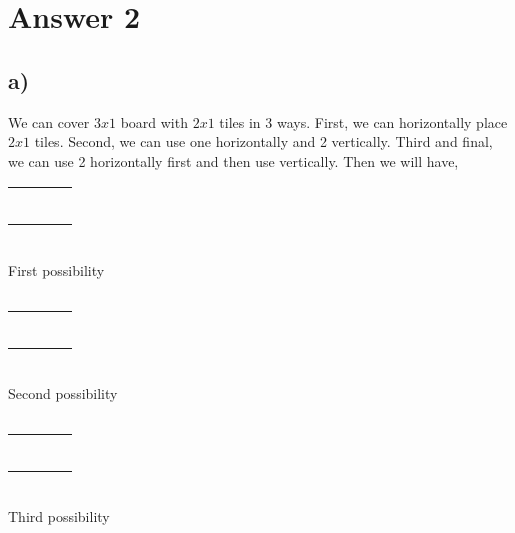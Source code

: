 \documentclass[12pt]{article}
\begin{document}
\section*{Answer 2}
\subsection*{a)}
We can cover $3x1$ board with $2x1$ tiles in 3 ways. First, we can horizontally place $2x1$ tiles. Second, we can use one horizontally and 2 vertically. Third and final, we can use 2 horizontally first and then use vertically. Then we will have, \\

\begin{tabular}{|cccc|}
\hline 
 &  &  & \tabularnewline
 &  &  & \tabularnewline
\hline 
\hline 
 &  &  & \tabularnewline
 &  &  & \tabularnewline
\hline 
\hline 
 &  &  & \tabularnewline
 &  &  & \tabularnewline
\hline 
\end{tabular} \\
First possibility

$ $ \\
$ $ \\

\begin{tabular}{|cc||cc|}
\hline 
 & \multicolumn{1}{c}{} &  & \tabularnewline
 & \multicolumn{1}{c}{} &  & \tabularnewline
\hline 
\hline 
 &  &  & \tabularnewline
 &  &  & \tabularnewline
 &  &  & \tabularnewline
 &  &  & \tabularnewline
\hline 
\end{tabular} \\
Second possibility

$ $ \\
$ $ \\

\begin{tabular}{|cc||cc|}
\hline 
 &  &  & \tabularnewline
 &  &  & \tabularnewline
 &  &  & \tabularnewline
 &  &  & \tabularnewline
\hline 
\hline 
 & \multicolumn{1}{c}{} &  & \tabularnewline
 & \multicolumn{1}{c}{} &  & \tabularnewline
\hline 
\end{tabular} \\
Third possibility

$ $ \\
$ $ \\
\end{document}
